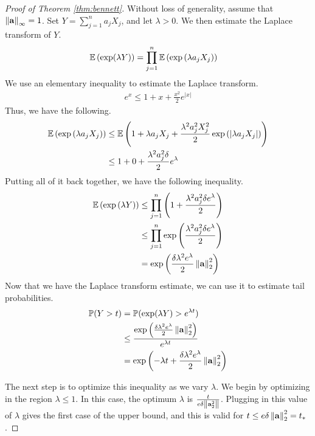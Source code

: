 \documentclass[11pt]{article}
\begin{document}
\begin{proof}[Proof of Theorem \ref{thm:bennett}]
  Without loss of generality, assume that $\left\lVert\mathbf{a}\right\rVert_{\infty} = 1$.
  Set $Y = \sum_{j=1}^n a_j X_j$, and let $\lambda > 0$.
  We then estimate the Laplace transform of $Y$.
  \begin{align*}
    \mathbb{E}\left( \exp(\lambda Y) \right) &= \prod_{j=1}^n \mathbb{E}\left(\exp\left(\lambda a_j X_j \right) \right)
  \end{align*}
  We use an elementary inequality to estimate the Laplace transform.
  \begin{align*}
    e^x \leq 1 + x + \frac{x^2}{2} e^{|x|}
  \end{align*}
  Thus, we have the following.
  \begin{align*}
    \mathbb{E}\left( \exp\left( \lambda a_j X_j \right) \right) &\leq \mathbb{E}\left(1 + \lambda a_j X_j + \frac{\lambda^2 a_j^2 X_j^2}{2} \exp\left( \left| \lambda a_j X_j \right| \right)\right) \\
    &\leq 1 + 0 + \frac{\lambda^2 a_j^2 \delta}{2} e^{\lambda}
  \end{align*}
  Putting all of it back together, we have the following inequality.
  \begin{align*}
    \mathbb{E}\left( \exp\left( \lambda Y \right) \right) &\leq \prod_{j=1}^n \left( 1 + \frac{\lambda^2 a_j^2 \delta e^{\lambda}}{2} \right) \\
                                                  &\leq \prod_{j=1}^n \exp\left( \frac{\lambda^2 a_j^2 \delta e^{\lambda}}{2} \right) \\
                                                  &= \exp\left( \frac{\delta\lambda^2 e^{\lambda}}{2} \left\lVert\mathbf{a}\right\rVert_2^2 \right)
  \end{align*}
  Now that we have the Laplace transform estimate, we can use it to estimate tail probabilities.
  \begin{align*}
    \mathbb{P}(Y > t) &= \mathbb{P}(\exp(\lambda Y) > e^{\lambda t}) \\
              &\leq \frac{\exp\left( \frac{\delta\lambda^2 e^{\lambda}}{2} \left\lVert\mathbf{a}\right\rVert_2^2 \right)}{e^{\lambda t}} \\
              &= \exp\left( -\lambda t + \frac{\delta\lambda^2 e^{\lambda}}{2} \left\lVert\mathbf{a}\right\rVert_2^2 \right)
  \end{align*}

  The next step is to optimize this inequality as we vary $\lambda$.
  We begin by optimizing in the region $\lambda \leq 1$.
  In this case, the optimum $\lambda$ is $\frac{t}{e\delta \left\lVert\mathbf{a}_2^2\right\rVert}$.
  Plugging in this value of $\lambda$ gives the first case of the upper bound, and this is valid for $t \leq e\delta \left\lVert\mathbf{a}\right\rVert_2^2 = t_{\ast}$.


\end{proof}
\end{document}
